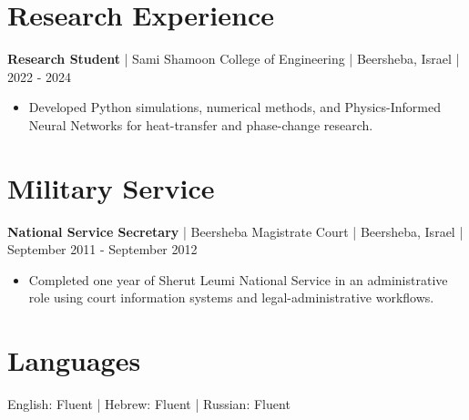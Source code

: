 \documentclass[11pt,a4paper]{article}
\newcommand{\workentry}[5]{%
  \Needspace{5\baselineskip}
  \textbf{#1} | #2 | #3 | #4\par
  \begin{itemize}
    #5
  \end{itemize}
}
\begin{document}
\section*{Research Experience}
\workentry{Research Student}{Sami Shamoon College of Engineering}{Beersheba, Israel}{2022 - 2024}{
  \item Developed Python simulations, numerical methods, and Physics-Informed Neural Networks for heat-transfer and phase-change research.
}

\section*{Military Service}
\workentry{National Service Secretary}{Beersheba Magistrate Court}{Beersheba, Israel}{September 2011 - September 2012}{
  \item Completed one year of Sherut Leumi National Service in an administrative role using court information systems and legal-administrative workflows.
}

\section*{Languages}
English: Fluent | Hebrew: Fluent | Russian: Fluent
\end{document}
